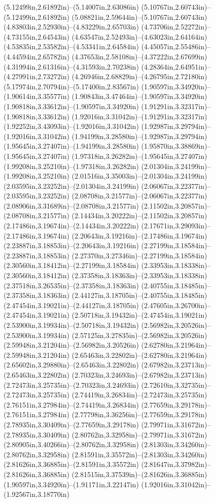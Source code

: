 (5.12499in,2.61892in)--(5.14007in,2.63086in) (5.10767in,2.60743in)--(5.12499in,2.61892in) (5.08821in,2.59644in)--(5.10767in,2.60743in) (4.83803in,2.52930in)--(4.83229in,2.65703in) (4.73706in,2.52272in)--(4.73155in,2.64543in) (4.63547in,2.52493in)--(4.63023in,2.64164in) (4.53835in,2.53582in)--(4.53341in,2.64584in) (4.45057in,2.55486in)--(4.44594in,2.65782in) (4.37653in,2.58108in)--(4.37222in,2.67699in) (4.31994in,2.61316in)--(4.31593in,2.70238in) (4.28364in,2.64951in)--(4.27991in,2.73272in) (4.26946in,2.68829in)--(4.26795in,2.72180in) (5.17974in,2.70794in)--(5.17400in,2.83567in) (1.90597in,3.34920in)--(1.90614in,3.35577in) (1.90843in,3.47464in)--(1.90597in,3.34920in) (1.90818in,3.33612in)--(1.90597in,3.34920in) (1.91291in,3.32317in)--(1.90818in,3.33612in) (1.92016in,3.31042in)--(1.91291in,3.32317in) (1.92252in,3.43093in)--(1.92016in,3.31042in) (1.92987in,3.29794in)--(1.92016in,3.31042in) (1.94199in,3.28580in)--(1.92987in,3.29794in) (1.95645in,3.27407in)--(1.94199in,3.28580in) (1.95870in,3.38869in)--(1.95645in,3.27407in) (1.97318in,3.26282in)--(1.95645in,3.27407in) (1.99208in,3.25210in)--(1.97318in,3.26282in) (2.01304in,3.24199in)--(1.99208in,3.25210in) (2.01516in,3.35003in)--(2.01304in,3.24199in) (2.03595in,3.23252in)--(2.01304in,3.24199in) (2.06067in,3.22377in)--(2.03595in,3.23252in) (2.08708in,3.21577in)--(2.06067in,3.22377in) (2.08906in,3.31689in)--(2.08708in,3.21577in) (2.11502in,3.20857in)--(2.08708in,3.21577in) (2.14434in,3.20222in)--(2.11502in,3.20857in) (2.17486in,3.19674in)--(2.14434in,3.20222in) (2.17671in,3.29093in)--(2.17486in,3.19674in) (2.20643in,3.19216in)--(2.17486in,3.19674in) (2.23887in,3.18853in)--(2.20643in,3.19216in) (2.27199in,3.18584in)--(2.23887in,3.18853in) (2.27370in,3.27346in)--(2.27199in,3.18584in) (2.30560in,3.18412in)--(2.27199in,3.18584in) (2.33953in,3.18338in)--(2.30560in,3.18412in) (2.37358in,3.18363in)--(2.33953in,3.18338in) (2.37518in,3.26535in)--(2.37358in,3.18363in) (2.40755in,3.18485in)--(2.37358in,3.18363in) (2.44127in,3.18705in)--(2.40755in,3.18485in) (2.47454in,3.19021in)--(2.44127in,3.18705in) (2.47605in,3.26700in)--(2.47454in,3.19021in) (2.50718in,3.19432in)--(2.47454in,3.19021in) (2.53900in,3.19934in)--(2.50718in,3.19432in) (2.56982in,3.20526in)--(2.53900in,3.19934in) (2.57125in,3.27835in)--(2.56982in,3.20526in) (2.59948in,3.21204in)--(2.56982in,3.20526in) (2.62780in,3.21964in)--(2.59948in,3.21204in) (2.65463in,3.22802in)--(2.62780in,3.21964in) (2.65602in,3.29880in)--(2.65463in,3.22802in) (2.67982in,3.23713in)--(2.65463in,3.22802in) (2.70323in,3.24693in)--(2.67982in,3.23713in) (2.72473in,3.25735in)--(2.70323in,3.24693in) (2.72610in,3.32735in)--(2.72473in,3.25735in) (2.74419in,3.26834in)--(2.72473in,3.25735in) (2.76151in,3.27984in)--(2.74419in,3.26834in) (2.77659in,3.29178in)--(2.76151in,3.27984in) (2.77798in,3.36256in)--(2.77659in,3.29178in) (2.78935in,3.30409in)--(2.77659in,3.29178in) (2.79971in,3.31672in)--(2.78935in,3.30409in) (2.80762in,3.32958in)--(2.79971in,3.31672in) (2.80905in,3.40266in)--(2.80762in,3.32958in) (2.81303in,3.34260in)--(2.80762in,3.32958in) (2.81591in,3.35572in)--(2.81303in,3.34260in) (2.81626in,3.36885in)--(2.81591in,3.35572in) (2.81647in,3.37982in)--(2.81626in,3.36885in) (2.81515in,3.37539in)--(2.81626in,3.36885in) (1.90597in,3.34920in)--(1.91171in,3.22147in) (1.92016in,3.31042in)--(1.92567in,3.18770in) 
